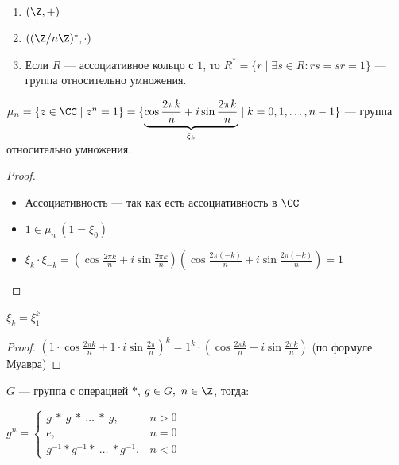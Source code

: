 \begin{examples}~

    \begin{enumerate}
        \item $(\Z, +)$
        \item $((\Z/n\Z)^*, \cdot)$
        \item Если $R$ --- ассоциативное кольцо с $1$, то $R^* = \{r \mid \exists s \in R : rs = sr = 1\}$ --- группа относительно умножения.
    \end{enumerate}
\end{examples}

\begin{theorem-non}
    $\mu_n = \{ z \in \CC \mid z^n = 1\} = \{ \underbrace{\cos \frac{2 \pi k}{n} + i \sin \frac{2 \pi k}{n}}_{\xi_k} \mid k = 0, 1, \ldots, n-1 \}$ --- группа относительно умножения.
\end{theorem-non}

\begin{proof}

    \begin{itemize}
        \item Ассоциативность --- так как есть ассоциативность в $\CC$
        
        \item $1 \in \mu_n~(1 = \xi_0)$
        
        \item $\xi_k \cdot \xi_{-k} = \left( \cos \frac{2 \pi k}{n} + i \sin \frac{2 \pi k}{n} \right) \left( \cos \frac{2 \pi (-k)}{n} + i \sin \frac{2 \pi (-k)}{n} \right) = 1$
    \end{itemize}
\end{proof}

\begin{lemma}
    $\xi_k = \xi_1^k$
\end{lemma}

\begin{proof}
    $\left(1 \cdot \cos \frac{2 \pi k}{n} + 1 \cdot i \sin \frac{2 \pi}{n}\right)^k = 1^k \cdot \left( \cos \frac{2 \pi k}{n} + i \sin \frac{2 \pi k}{n} \right)$ (по формуле Муавра)
\end{proof}

\begin{defn}
    $G$ --- группа с операцией $*$, $g \in G,~n \in \Z$, тогда:

    $g^n = \begin{cases}
        g~*~g~*~\ldots~*~g, & n > 0 \\
        e, & n = 0 \\
        g^{-1} * g^{-1} *~\ldots~* g^{-1}, & n < 0
    \end{cases}$
\end{defn}

